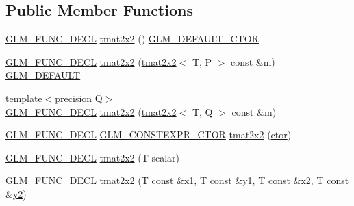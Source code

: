 \subsection*{Public Member Functions}
\begin{DoxyCompactItemize}
\item 
\mbox{\hyperlink{setup_8hpp_ab2d052de21a70539923e9bcbf6e83a51}{G\+L\+M\+\_\+\+F\+U\+N\+C\+\_\+\+D\+E\+CL}} \mbox{\hyperlink{structglm_1_1tmat2x2_a4618ed5c3103b8bae249fe6f74b14ce4}{tmat2x2}} () \mbox{\hyperlink{setup_8hpp_afb97a4e995bc004c0cbbfa22125b80ba}{G\+L\+M\+\_\+\+D\+E\+F\+A\+U\+L\+T\+\_\+\+C\+T\+OR}}
\item 
\mbox{\hyperlink{setup_8hpp_ab2d052de21a70539923e9bcbf6e83a51}{G\+L\+M\+\_\+\+F\+U\+N\+C\+\_\+\+D\+E\+CL}} \mbox{\hyperlink{structglm_1_1tmat2x2_a35326be3558b276f538fe1968eb22df5}{tmat2x2}} (\mbox{\hyperlink{structglm_1_1tmat2x2}{tmat2x2}}$<$ T, P $>$ const \&m) \mbox{\hyperlink{setup_8hpp_aefce7051c376a64ba89fa93a9f63bc2c}{G\+L\+M\+\_\+\+D\+E\+F\+A\+U\+LT}}
\item 
{\footnotesize template$<$precision Q$>$ }\\\mbox{\hyperlink{setup_8hpp_ab2d052de21a70539923e9bcbf6e83a51}{G\+L\+M\+\_\+\+F\+U\+N\+C\+\_\+\+D\+E\+CL}} \mbox{\hyperlink{structglm_1_1tmat2x2_a2f3cdab306325bbc4b1e1c57eb3a203a}{tmat2x2}} (\mbox{\hyperlink{structglm_1_1tmat2x2}{tmat2x2}}$<$ T, Q $>$ const \&m)
\item 
\mbox{\hyperlink{setup_8hpp_ab2d052de21a70539923e9bcbf6e83a51}{G\+L\+M\+\_\+\+F\+U\+N\+C\+\_\+\+D\+E\+CL}} \mbox{\hyperlink{setup_8hpp_ad34178a09666081abdb573c14d1f4a5a}{G\+L\+M\+\_\+\+C\+O\+N\+S\+T\+E\+X\+P\+R\+\_\+\+C\+T\+OR}} \mbox{\hyperlink{structglm_1_1tmat2x2_aa94dafb83a5e771d080c54859cb80f51}{tmat2x2}} (\mbox{\hyperlink{namespaceglm_a807df837905ec286f806a536af03b57f}{ctor}})
\item 
\mbox{\hyperlink{setup_8hpp_ab2d052de21a70539923e9bcbf6e83a51}{G\+L\+M\+\_\+\+F\+U\+N\+C\+\_\+\+D\+E\+CL}} \mbox{\hyperlink{structglm_1_1tmat2x2_a83d1b6a2d8ed8b6ce0f8363b5dd2682f}{tmat2x2}} (T scalar)
\item 
\mbox{\hyperlink{setup_8hpp_ab2d052de21a70539923e9bcbf6e83a51}{G\+L\+M\+\_\+\+F\+U\+N\+C\+\_\+\+D\+E\+CL}} \mbox{\hyperlink{structglm_1_1tmat2x2_ab7ee77d8b2dcae2fdcd50192ff34ab90}{tmat2x2}} (T const \&x1, T const \&\mbox{\hyperlink{glad_8h_a48340161068d267815ac3131e9d03def}{y1}}, T const \&\mbox{\hyperlink{glad_8h_ad2cea6eadb01f017f0d57e7edf0ce988}{x2}}, T const \&\mbox{\hyperlink{glad_8h_af7158b5d27f7a6aa4ab9973fcc3a5c20}{y2}})
\item 

\end{DoxyCompactItemize}
